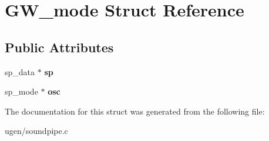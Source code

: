 \hypertarget{structGW__mode}{}\section{G\+W\+\_\+mode Struct Reference}
\label{structGW__mode}
\subsection*{Public Attributes}
\begin{DoxyCompactItemize}
\item 
\hypertarget{structGW__mode_a94a215c8be8017870dfbfc05c41d7383}{}\label{structGW__mode_a94a215c8be8017870dfbfc05c41d7383} 
sp\+\_\+data $\ast$ {\bfseries sp}
\item 
\hypertarget{structGW__mode_a4b56c256f3c87434b210173df5d957f3}{}\label{structGW__mode_a4b56c256f3c87434b210173df5d957f3} 
sp\+\_\+mode $\ast$ {\bfseries osc}
\end{DoxyCompactItemize}


The documentation for this struct was generated from the following file\+:\begin{DoxyCompactItemize}
\item 
ugen/soundpipe.\+c\end{DoxyCompactItemize}
